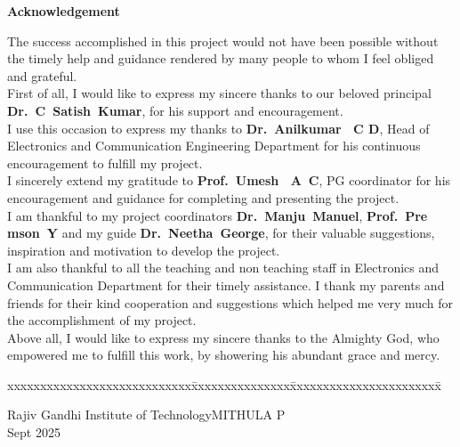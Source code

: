 \vspace{.25in}
\begin{center}
\large{\textbf{Acknowledgement}}
\vspace{0.3in}
\end{center}
 
The success accomplished in this project would not have been possible without the timely help and guidance rendered by many people to whom I feel obliged and grateful.\\
\indent First of all, I would like to express my sincere thanks to our beloved principal \textbf{Dr.~C~Satish~Kumar}, for his support and encouragement.\\
\indent I use this occasion to express my thanks to \textbf{Dr.~Anilkumar ~C D}, Head of Electronics and Communication Engineering Department for his continuous encouragement to fulfill my project.\\
\indent I sincerely extend my gratitude to \textbf{Prof.~Umesh ~A~C}, PG coordinator for his  encouragement and guidance for completing and presenting the project.\\
\indent I am thankful to my project coordinators \textbf{Dr.~Manju~Manuel}, \textbf{Prof.~Pre\\mson~Y} and my guide \textbf{Dr.~Neetha~George}, for their valuable suggestions, inspiration and motivation to develop the project.\\
\indent I am also thankful to all the teaching and non teaching staff in Electronics and Communication Department for their timely assistance. I thank my parents and friends for their kind cooperation and suggestions which helped me very much for the accomplishment of my project.\\
\indent Above all, I would like to express my sincere thanks to the Almighty God, who empowered me to fulfill this work, by showering his abundant grace and mercy.\\

\vspace{0.5in}
\begin{tabbing}
xxxxxxxxxxxxxxxxxxxxxxxxxxxx\= xxxxxxxxxxxxxxx\= xxxxxxxxxxxxxxxxxxxxxxx\= \kill
 
Rajiv Gandhi Institute of Technology\>\>MITHULA P\\
Sept 2025
\end{tabbing}
